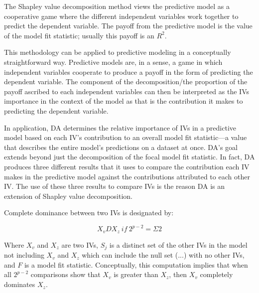\documentclass[ShortAfour,times,sageapa]{sagej}
\begin{document}
	
	The Shapley value decomposition method views the predictive model as a cooperative game where the different independent variables work together to predict the dependent variable.  
	The payoff from the predictive model is the value of the model fit statistic; usually this payoff is an $R^2$. %
	
	
	This methodology can be applied to predictive modeling in a conceptually straightforward way.
	 Predictive models are, in a sense, a game in which independent variables cooperate to produce a payoff in the form of predicting the dependent variable. 
	The component of the decomposition/the proportion of the payoff ascribed to each independent variables can then be interpreted as the IVs importance in the context of the model as that is the contribution it makes to predicting the dependent variable.
	
	
	In application, DA determines the relative importance of IVs in a predictive model based on each IV’s contribution to an overall model fit statistic—a value that describes the entire model’s predictions on a dataset at once. 
	DA’s goal extends beyond just the decomposition of the focal model fit statistic. 
	In fact, DA produces three different results that it uses to compare the contribution each IV makes in the predictive model against the contributions attributed to each other IV. 
	The use of these three results to compare IVs is the reason DA is an extension of Shapley value decomposition.
	
	Complete dominance between two IVs is designated by:
	
	\begin{equation}
		X_{v}DX_{z}\ if\ 2^{p-2} = \Sigma{2} %
	\end{equation}
	
	Where $X_v$ and $X_z$ are two IVs, $S_j$ is a distinct set of the other IVs in the model not including $X_v$ and $X_z$ which can include the null set (...) with no other IVs, and $F$ is a model fit statistic. Conceptually, this computation implies that when all $2^{p-2}$ comparisons show that $X_v$ is greater than $X_z$, then $X_v$ completely dominates $X_z$.
	
\end{document}
